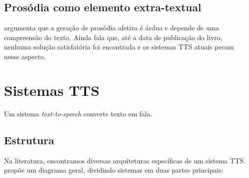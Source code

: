 \subsection{Prosódia como elemento extra-textual}
 argumenta que a geração de prosódia afetiva é árdua e
depende de uma compreensão do texto. Ainda fala que, até a data de publicação do
livro, nenhuma solução satisfatória foi encontrada e os sistemas TTS atuais
pecam nesse aspecto.

\section{Sistemas TTS}
Um sistema \emph{text-to-speech} converte texto em fala.
\subsection{Estrutura}
Na literatura, encontramos diversas arquiteturas específicas de um sistema TTS.
 propõe um diagrama geral, dividindo sistemas em duas partes principais:

